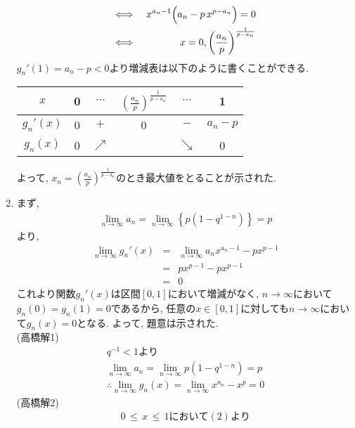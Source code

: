 \documentclass[dvipdfmx,titlepage, 11pt, a4paper]{jsarticle}%
\begin{document}
\begin{enumerate}[(1)]
\begin{eqnarray*}
		      \Longleftrightarrow\ && x^{a_{n}-1}\Bigl(a_{n}-p\,x^{p-a_{n}}\Bigr)=0\\
		      \Longleftrightarrow\ && x=0,\left(\frac{a_{n}}{p}\right)^{\frac{1}{p-a_{n}}}
	      \end{eqnarray*}
	      $g_{n}'(1)=a_{n}-p<0$より増減表は以下のように書くことができる.
	      \begin{center}
		      \begin{tabular}{|c|c||c|c|c|c|}\hline
			      $x$         & 0 & $\cdots$   & $\displaystyle \left(\frac{a_{n}}{p}\right)^{\frac{1}{p-a_{n}}}$ & $\cdots$   & 1         \\ \hline
			      $g_{n}'(x)$ & 0 & $+$        & 0                                                                & $-$        & $a_{n}-p$ \\ \hline
			      $g_{n}(x)$  & 0 & $\nearrow$ &                                                                  & $\searrow$ & 0         \\ \hline
		      \end{tabular}
	      \end{center}
	      よって, $x_{n}=\displaystyle \left(\frac{a_{n}}{p}\right)^{\frac{1}{p-a_{n}}}$のとき最大値をとることが示された.
	\item まず,
	      \begin{eqnarray*}
		      \lim_{n\to \infty}a_{n}=\lim_{n\to \infty}\left\{p(1-q^{1-n})\right\}=p
	      \end{eqnarray*}
	      より,
	      \begin{eqnarray*}
		      \lim_{n\to \infty}g_{n}'(x) &=& \lim_{n\to \infty}a_{n}x^{a_{n}-1}-px^{p-1}\\
		      &=& px^{p-1}-px^{p-1}\\
		      &=&0
	      \end{eqnarray*}
		  これより関数$g_{n}'(x)$は区間$[0,1]$において増減がなく, $n\to \infty$において$g_{n}(0)=g_{n}(1)=0$であるから, 任意の$x\in[0,1]$に対しても$n\to \infty$において$g_{n}(x)=0$となる. よって, 題意は示された.\\[1cm]
		  (高橋解1)
		  \begin{eqnarray*}
			q^{-1} < 1より\\
			\lim_{n\to \infty}a_{n} = \lim_{n\to \infty}p(1 - q^{1 - n}) = p\\
			\therefore \lim_{n\to \infty}g_{n}(x) = \lim_{n\to \infty}x^{a_n} - x^{p} = 0
		  \end{eqnarray*}
		  (高橋解2)
		  \begin{eqnarray*}
			0\, \leq\, x\, \leq\, 1において(2)より\\

\end{eqnarray*}
\end{enumerate}
\end{document}
